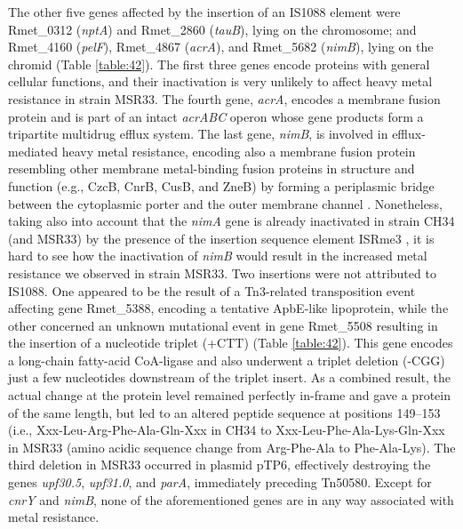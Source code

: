 The other five genes affected by the insertion of an IS1088 element were Rmet\_0312 (\textit{nptA}) and Rmet\_2860 (\textit{tauB}), lying on the chromosome; and Rmet\_4160 (\textit{pelF}), Rmet\_4867 (\textit{acrA}), and Rmet\_5682 (\textit{nimB}), lying on the chromid (Table \ref{table:42}). The first three genes encode proteins with general cellular functions, and their inactivation is very unlikely to affect heavy metal resistance in strain MSR33. The fourth gene, \textit{acrA}, encodes a membrane fusion protein and is part of an intact \textit{acrABC} operon whose gene products form a tripartite multidrug efflux system. The last gene, \textit{nimB}, is involved in efflux-mediated heavy metal resistance, encoding also a membrane fusion protein resembling other membrane metal-binding fusion proteins in structure and function (e.g., CzcB, CnrB, CusB, and ZneB) by forming a periplasmic bridge between the cytoplasmic porter and the outer membrane channel \citep{kim2011switch}. Nonetheless, taking also into account that the \textit{nimA} gene is already inactivated in strain CH34 (and MSR33) by the presence of the insertion sequence element ISRme3 \citep{janssen2010complete}, it is hard to see how the inactivation of \textit{nimB} would result in the increased metal resistance we observed in strain MSR33. Two insertions were not attributed to IS1088. One appeared to be the result of a Tn3-related transposition event affecting gene Rmet\_5388, encoding a tentative ApbE-like lipoprotein, while the other concerned an unknown mutational event in gene Rmet\_5508 resulting in the insertion of a nucleotide triplet (+CTT) (Table \ref{table:42}). This gene encodes a long-chain fatty-acid CoA-ligase and also underwent a triplet deletion (-CGG) just a few nucleotides downstream of the triplet insert. As a combined result, the actual change at the protein level remained perfectly in-frame and gave a protein of the same length, but led to an altered peptide sequence at positions 149–153 (i.e., Xxx-Leu-Arg-Phe-Ala-Gln-Xxx in CH34 to Xxx-Leu-Phe-Ala-Lys-Gln-Xxx in MSR33 (amino acidic sequence change from Arg-Phe-Ala to Phe-Ala-Lys). The third deletion in MSR33 occurred in plasmid pTP6, effectively destroying the genes \textit{upf30.5}, \textit{upf31.0}, and \textit{parA}, immediately preceding Tn50580. Except for \textit{cnrY} and \textit{nimB}, none of the aforementioned genes are in any way associated with metal resistance.

